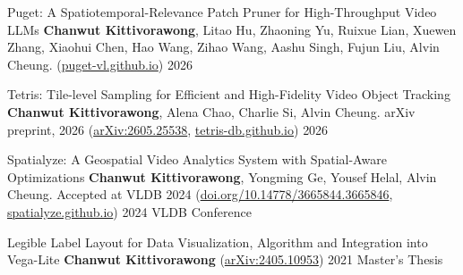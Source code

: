 

\begin{cvpubs}

  \cvpub
    {Puget: A Spatiotemporal-Relevance Patch Pruner for High-Throughput Video LLMs} %
    {\textbf{Chanwut Kittivorawong}, Litao Hu, Zhaoning Yu, Ruixue Lian, Xuewen Zhang, Xiaohui Chen, Hao Wang, Zihao Wang, Aashu Singh, Fujun Liu, Alvin Cheung. (\href{https://puget-vl.github.io}{puget-vl.github.io})} %
    {2026} %
    {} %

  \cvpub
    {Tetris: Tile-level Sampling for Efficient and High-Fidelity Video Object Tracking} %
    {\textbf{Chanwut Kittivorawong}, Alena Chao, Charlie Si, Alvin Cheung. arXiv preprint, 2026 (\href{https://arxiv.org/abs/2605.25538}{arXiv:2605.25538}, \href{https://tetris-db.github.io}{tetris-db.github.io})} %
    {2026} %
    {} %

  \cvpub
    {Spatialyze: A Geospatial Video Analytics System with Spatial-Aware Optimizations} %
    {\textbf{Chanwut Kittivorawong}, Yongming Ge, Yousef Helal, Alvin Cheung. Accepted at VLDB 2024 (\href{https://doi.org/10.14778/3665844.3665846}{doi.org/10.14778/3665844.3665846}, \href{https://spatialyze.github.io}{spatialyze.github.io})} %
    {2024} %
    {VLDB Conference} %
    


  \cvpub
    {Legible Label Layout for Data Visualization, Algorithm and Integration into Vega-Lite} %
    {\textbf{Chanwut Kittivorawong} (\href{https://arxiv.org/abs/2405.10953}{arXiv:2405.10953})} %
    {2021} %
    {Master's Thesis} %


\end{cvpubs}
